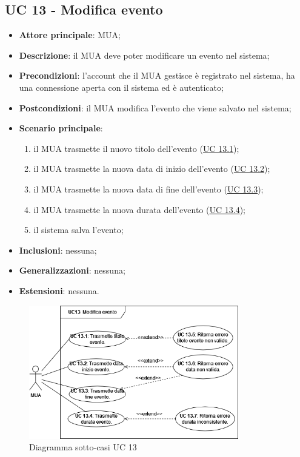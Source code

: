 \subsection{UC 13 - Modifica evento} \label{sec:UC13}
    \begin{itemize}
        \item \textbf{Attore principale}: MUA;
        \item \textbf{Descrizione}: il MUA deve poter modificare un evento nel sistema;
        \item \textbf{Precondizioni}: l’account che il MUA gestisce è registrato nel sistema, ha una connessione aperta con il sistema ed è autenticato;
        \item \textbf{Postcondizioni}: il MUA modifica l'evento che viene salvato nel sistema;
        \item \textbf{Scenario principale}:
            \begin{enumerate}
                \item il MUA trasmette il nuovo titolo dell'evento (\hyperref[sec:UC13.1]{UC 13.1});
                \item il MUA trasmette la nuova data di inizio dell'evento (\hyperref[sec:UC13.2]{UC 13.2});
                \item il MUA trasmette la nuova data di fine dell'evento (\hyperref[sec:UC13.3]{UC 13.3});
                \item il MUA trasmette la nuova durata dell'evento (\hyperref[sec:UC13.4]{UC 13.4});
                \item il sistema salva l'evento;
            \end{enumerate}
        \item \textbf{Inclusioni}: nessuna;
        \item \textbf{Generalizzazioni}: nessuna;
        \item \textbf{Estensioni}: nessuna.
    \end{itemize}

\begin{figure}[H]
    \includegraphics[width=0.813\textwidth]{sections/uc_imgs/UC13.png}
    \centering
    \caption{Diagramma sotto-casi UC 13}
\end{figure}

